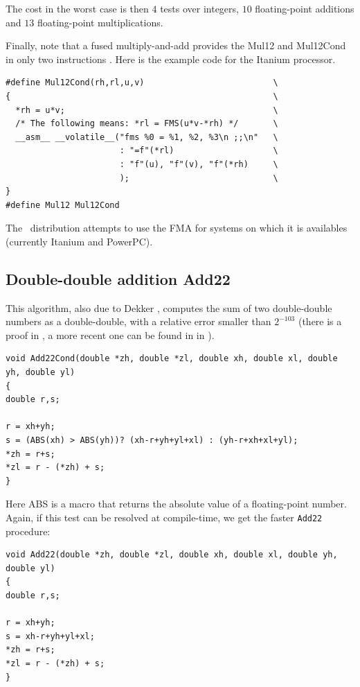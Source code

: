 The cost in the worst case is then $4$ tests over integers,
$10$ floating-point additions and $13$ floating-point multiplications.


Finally, note that a fused multiply-and-add provides the Mul12 and
Mul12Cond in only two instructions \cite{CorneaHarrisonTang2002}. Here
is the example code for the Itanium processor.

\begin{lstlisting}[label={lst:Mul12CondFMA},caption={Mul12 on the Itanium},firstnumber=1]
#define Mul12Cond(rh,rl,u,v)                          \
{                                                     \
  *rh = u*v;                                          \
  /* The following means: *rl = FMS(u*v-*rh) */       \
  __asm__ __volatile__("fms %0 = %1, %2, %3\n ;;\n"   \
                       : "=f"(*rl)                    \
                       : "f"(u), "f"(v), "f"(*rh)     \
                       );                             \
}
#define Mul12 Mul12Cond
\end{lstlisting}

The \crlibm\ distribution attempts to use the FMA for systems on which
it is availables (currently Itanium and PowerPC).




\subsection{Double-double addition {Add22}}
  
This algorithm, also due to Dekker \cite{Dek71}, computes the sum of
two double-double numbers as a double-double, with a relative error
smaller than $2^{-103}$ (there is a proof in \cite{Dek71}, a more recent one can be found in in \cite{Lauter2005LIP:tripledouble}).


\begin{lstlisting}[label={Add22Cond},caption={Add22Cond},firstnumber=1]
void Add22Cond(double *zh, double *zl, double xh, double xl, double yh, double yl)
{
double r,s;

r = xh+yh;
s = (ABS(xh) > ABS(yh))? (xh-r+yh+yl+xl) : (yh-r+xh+xl+yl);
*zh = r+s;
*zl = r - (*zh) + s;
}
\end{lstlisting}

Here ABS is a macro that returns the absolute value of a
floating-point number. Again, if this test can be resolved at
compile-time, we get the faster \texttt{Add22} procedure:

\begin{lstlisting}[label={Add22},caption={Add22},firstnumber=1]
void Add22(double *zh, double *zl, double xh, double xl, double yh, double yl)
{
double r,s;

r = xh+yh;
s = xh-r+yh+yl+xl;
*zh = r+s;
*zl = r - (*zh) + s;
}
\end{lstlisting}




